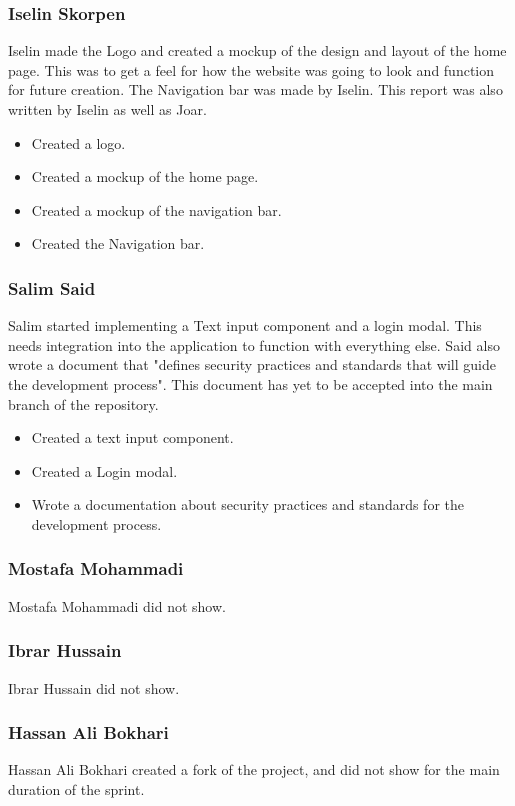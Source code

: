\documentclass[12pt]{article}
\begin{document}
\subsubsection{Iselin Skorpen}
Iselin made the Logo and created a mockup of the design and layout of the home page. This was to get a feel for how the website was 
going to look and function for future creation. The Navigation bar was made by Iselin. This report was also written by 
Iselin as well as Joar.
    \begin{itemize}
        \item Created a logo.
        \item Created a mockup of the home page.
        \item Created a mockup of the navigation bar.
        \item Created the Navigation bar.
    \end{itemize}
\subsubsection{Salim Said}
Salim started implementing a Text input component and a login modal. This needs integration into the application to function with everything 
else. Said also wrote a document that "defines security practices and standards that will guide the development process"\cite*{ShowitDocsSecurity}. 
This document has yet to be accepted into the main branch of the repository.
    \begin{itemize}
        \item Created a text input component.
        \item Created a Login modal.
        \item Wrote a documentation about security practices and standards for the development process.
    \end{itemize}
\subsubsection{Mostafa Mohammadi}
Mostafa Mohammadi did not show.
\subsubsection{Ibrar Hussain}
Ibrar Hussain did not show.
\subsubsection{Hassan Ali Bokhari}
Hassan Ali Bokhari created a fork of the project, and did not show for the main duration of the sprint.
\end{document}
